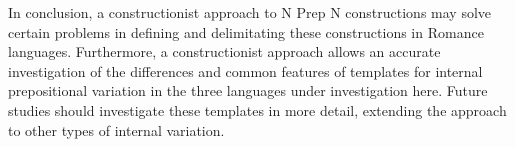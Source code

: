 \documentclass[output=paper]{langsci/langscibook}
\begin{document}
In conclusion, a constructionist approach to N Prep N constructions may solve certain problems in defining and delimitating these constructions in Romance languages. Furthermore, a constructionist approach allows an accurate investigation of the differences and common features of templates for internal prepositional variation in the three languages under investigation here. Future studies should investigate these templates in more detail, extending the approach to other types of internal variation. 

\nocite{Bell:2016}
\nocite{Goldberg:1995}
\nocite{Anscombre:1990}
\nocite{Berthonneau:1993}
\nocite{Booij:2010}
\nocite{Demonte:1999}
\nocite{Moyna:2011}



{\sloppy
  \printbibliography[heading=subbibliography,notkeyword=this]
}
\end{document}
